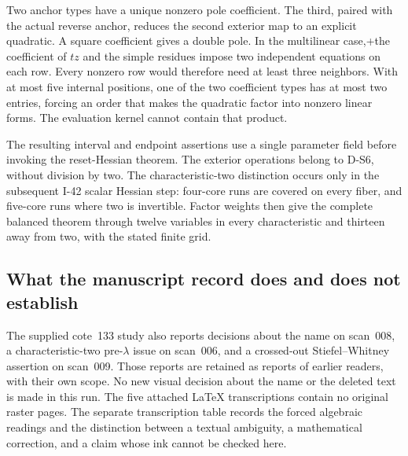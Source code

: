 Two anchor types have a unique nonzero pole coefficient.
The third, paired with the actual reverse anchor, reduces
the second exterior map to an explicit quadratic. A square
coefficient gives a double pole. In the multilinear case,+the coefficient of $tz$ and the simple residues impose two
independent equations on each row. Every nonzero row would
therefore need at least three neighbors. With at most five
internal positions, one of the two coefficient types has
at most two entries, forcing an order that makes the
quadratic factor into nonzero linear forms. The evaluation
kernel cannot contain that product.

The resulting interval and endpoint assertions use a single
parameter field before invoking the reset-Hessian theorem.
The exterior operations belong to D-S6, without division
by two. The characteristic-two distinction occurs only in
the subsequent I-42 scalar Hessian step: four-core runs
are covered on every fiber, and five-core runs where two
is invertible. Factor weights then give the complete balanced
theorem through twelve variables in every characteristic
and thirteen away from two, with the stated finite grid.

\subsection{What the manuscript record does and does not establish}
The supplied cote~133 study also reports decisions about the name on scan~008, a characteristic-two pre-$\lambda$ issue on scan~006, and a crossed-out Stiefel--Whitney assertion on scan~009. Those reports are retained as reports of earlier readers, with their own scope. No new visual decision about the name or the deleted text is made in this run. The five attached LaTeX transcriptions contain no original raster pages. The separate transcription table records the forced algebraic readings and the distinction between a textual ambiguity, a mathematical correction, and a claim whose ink cannot be checked here.
